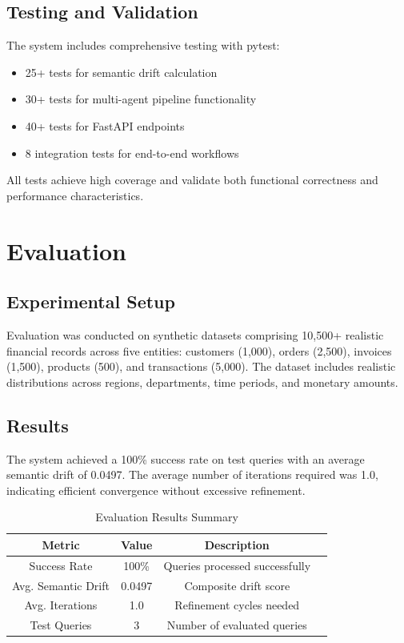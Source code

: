 \documentclass[conference]{IEEEtran}
\begin{document}
\subsection{Testing and Validation}

The system includes comprehensive testing with pytest:
\begin{itemize}
\item 25+ tests for semantic drift calculation
\item 30+ tests for multi-agent pipeline functionality
\item 40+ tests for FastAPI endpoints
\item 8 integration tests for end-to-end workflows
\end{itemize}

All tests achieve high coverage and validate both functional correctness and performance characteristics.

\section{Evaluation}
\label{sec:evaluation}

\subsection{Experimental Setup}

Evaluation was conducted on synthetic datasets comprising 10,500+ realistic financial records across five entities: customers (1,000), orders (2,500), invoices (1,500), products (500), and transactions (5,000). The dataset includes realistic distributions across regions, departments, time periods, and monetary amounts.

\subsection{Results}

The system achieved a 100\% success rate on test queries with an average semantic drift of 0.0497. The average number of iterations required was 1.0, indicating efficient convergence without excessive refinement.

\begin{table}[h]
\caption{Evaluation Results Summary}
\label{tab:results}
\begin{tabular}{|c|c|c|c|}
\hline
\textbf{Metric} & \textbf{Value} & \textbf{Description} \\
\hline
Success Rate & 100\% & Queries processed successfully \\
\hline
Avg. Semantic Drift & 0.0497 & Composite drift score \\
\hline
Avg. Iterations & 1.0 & Refinement cycles needed \\
\hline
Test Queries & 3 & Number of evaluated queries \\
\hline
\end{tabular}
\end{table}
\end{document}
